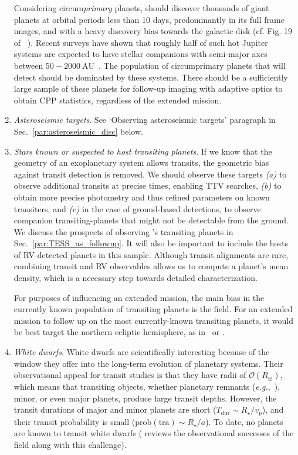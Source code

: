 \begin{enumerate}
	Considering circum\textit{primary} planets, \tess should discover thousands of giant planets at orbital periods less than 10 days, predominantly in its full frame images, and with a heavy discovery bias towards the galactic disk (cf. Fig. 19 of ~).
	Recent surveys have shown that roughly half of such hot Jupiter systems are expected to have stellar companions with semi-major axes between $50-2000\ \mathrm{AU}$~\citep{ngo_friends_2016}.
	The population of circumprimary planets that \tess will detect should be dominated by these systems.
	There should be a sufficiently large sample of these planets for follow-up imaging with adaptive optics to obtain CPP statistics, regardless of the extended mission.
	
	\item \textit{Asteroseismic targets}. See `Observing asteroseismic targets' paragraph in Sec.~\ref{par:asteroseismic_disc} below.
	
	
	\item \textit{Stars known or suspected to host transiting planets}. 
	If we know that the geometry of an exoplanetary system allows transits, the geometric bias against transit detection is removed.
	We should observe these targets \textit{(a)} to observe additional transits at precise times, enabling TTV searches, \textit{(b)} to obtain more precise photometry and thus refined parameters on known transiters, and \textit{(c)} in the case of ground-based detections, to observe companion transiting-planets that might not be detectable from the ground.
 	We discuss the prospects of \tess observing \kepler\!'s transiting planets in Sec.~\ref{par:TESS_as_followup}.
 	It will also be important to include the hosts of RV-detected planets in this sample. 
 	Although transit alignments are rare, combining transit and RV observables allows us to compute a planet's mean density, which is a necessary step towards detailed characterization. 
 	
 	For purposes of influencing an extended mission, the main bias in the currently known population of transiting planets is the \kepler field.
 	For an extended mission to follow up on the most currently-known transiting planets, it would be best target the northern ecliptic hemisphere, as in \npole\ or \nhemi.
	
	\item \textit{White dwarfs}.
	White dwarfs are scientifically interesting because of the window they offer into the long-term evolution of planetary systems.
	Their observational appeal for transit studies is that they have radii of $\mathcal{O}(R_\oplus)$, which means that transiting objects, whether planetary remnants (\textit{e.g.},~\citep{vanderburg_disintegrating_2015}), minor, or even major planets, produce large transit depths.
	However, the transit durations of major and minor planets are short ($T_\mathrm{dur} \sim R_\star / v_p$), and their transit probability is small ($\mathrm{prob}(\mathrm{tra}) \sim R_\star / a $).
	To date, no planets are known to transit white dwarfs (\citet{veras_postMS_2016} reviews the observational successes of the field along with this challenge).
	

\end{enumerate}
